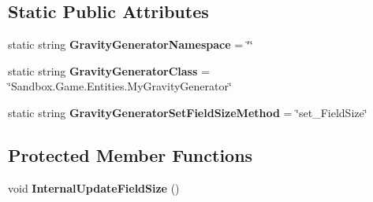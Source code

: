 \subsection*{Static Public Attributes}
\begin{DoxyCompactItemize}
\item 
\hypertarget{class_s_e_mod_a_p_i_internal_1_1_a_p_i_1_1_entity_1_1_sector_1_1_sector_object_1_1_cube_grid_1_152f45445d79844991feac643e7a7ab7c_ad9bd828ddc02df382542e5c28723f544}{}static string {\bfseries Gravity\+Generator\+Namespace} = \char`\"{}\char`\"{}\label{class_s_e_mod_a_p_i_internal_1_1_a_p_i_1_1_entity_1_1_sector_1_1_sector_object_1_1_cube_grid_1_152f45445d79844991feac643e7a7ab7c_ad9bd828ddc02df382542e5c28723f544}

\item 
\hypertarget{class_s_e_mod_a_p_i_internal_1_1_a_p_i_1_1_entity_1_1_sector_1_1_sector_object_1_1_cube_grid_1_152f45445d79844991feac643e7a7ab7c_a4622af8d9a22f58e8b2607893cab2770}{}static string {\bfseries Gravity\+Generator\+Class} = \char`\"{}Sandbox.\+Game.\+Entities.\+My\+Gravity\+Generator\char`\"{}\label{class_s_e_mod_a_p_i_internal_1_1_a_p_i_1_1_entity_1_1_sector_1_1_sector_object_1_1_cube_grid_1_152f45445d79844991feac643e7a7ab7c_a4622af8d9a22f58e8b2607893cab2770}

\item 
\hypertarget{class_s_e_mod_a_p_i_internal_1_1_a_p_i_1_1_entity_1_1_sector_1_1_sector_object_1_1_cube_grid_1_152f45445d79844991feac643e7a7ab7c_a13491f7d6787e23e72d5a1afb38ef77a}{}static string {\bfseries Gravity\+Generator\+Set\+Field\+Size\+Method} = \char`\"{}set\+\_\+\+Field\+Size\char`\"{}\label{class_s_e_mod_a_p_i_internal_1_1_a_p_i_1_1_entity_1_1_sector_1_1_sector_object_1_1_cube_grid_1_152f45445d79844991feac643e7a7ab7c_a13491f7d6787e23e72d5a1afb38ef77a}

\end{DoxyCompactItemize}
\subsection*{Protected Member Functions}
\begin{DoxyCompactItemize}
\item 
\hypertarget{class_s_e_mod_a_p_i_internal_1_1_a_p_i_1_1_entity_1_1_sector_1_1_sector_object_1_1_cube_grid_1_152f45445d79844991feac643e7a7ab7c_afbb94c9c47c4438b666a2fc6472ba6a0}{}void {\bfseries Internal\+Update\+Field\+Size} ()\label{class_s_e_mod_a_p_i_internal_1_1_a_p_i_1_1_entity_1_1_sector_1_1_sector_object_1_1_cube_grid_1_152f45445d79844991feac643e7a7ab7c_afbb94c9c47c4438b666a2fc6472ba6a0}

\end{DoxyCompactItemize}
